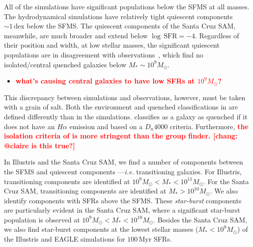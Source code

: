 \documentclass[preprint2,tighten]{aastex62}
\newcommand{\todo}[1]{{\bf \textcolor{red}{ #1}}}
\begin{document}
All of the simulations have significant populations below the SFMS at all 
masses. The hydrodynamical simulations have relatively tight quiescent components 
${\sim}1\,\mathrm{dex}$ below the SFMS. The quiescent components of the 
Santa Cruz SAM, meanwhile, are much broader and extend below 
$\log\,\mathrm{SFR} = -4$. Regardless of their position and width, at low stellar
masses, the significant quiescent populations are in disagreement with 
observations~\citep{geha2012}, which find no isolated/central quenched 
galaxies below $M_*{\sim}10^9 M_\odot$. 
\begin{itemize}
    \item \todo{what's causing central galaxies to have low SFRs at $10^9M_\odot$?}
\end{itemize}
This discrepancy between simulations and observations, however, must be 
taken with a grain of salt. Both the environment and quenched classifications 
in \cite{geha2012} are defined differently than in the simulations. 
\cite{geha2012} classifies as a galaxy as quenched if it
does not have an $H\alpha$ emission and based on a $D_n 4000$ criteria. 
Furthermore, \todo{the isolation criteria of \cite{geha2012} is more 
stringent than the group finder. [chang: @claire is this true?]} 

In Illustris and the Santa Cruz SAM, we find a number of components between 
the SFMS and quiescent components ---\emph{i.e.} transitioning galaxies. 
For Illustris, transitioning components 
are identified at $10^9 M_\odot < M_* < 10^{11}M_\odot$. For the Santa Cruz SAM, 
transitioning components are identified at $M_* > 10^{10} M_\odot$. We also 
identify components with SFRs above the SFMS. These \emph{star-burst} 
components are particularly evident in the Santa Cruz SAM, where a significant
star-burst population is observed at $10^9 M_\odot < M_* < 10^{10} M_\odot$. 
Besides the Santa Cruz SAM, we also find star-burst components at the lowest
stellar masses ($M_* < 10^9 M_\odot$) of the Illustris and EAGLE simulations 
for $100\,\mathrm{Myr}$ SFRs. 
\end{document}
